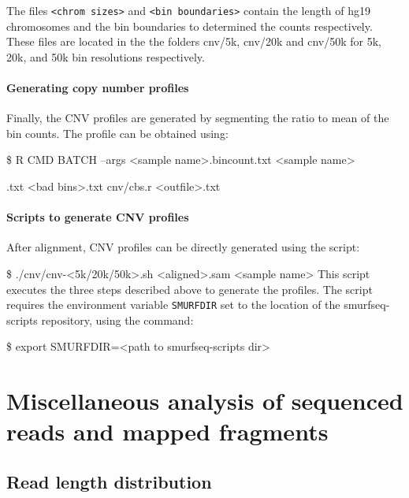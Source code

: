 \documentclass[11pt]{article}
\newenvironment{cmd}
{\list{}{
    \parsep=0em
    \itemindent=17pt
    \listparindent=50pt
    \leftmargin=0in
    \rightmargin=0in
  }\item[] \ttfamily \$}
{\endlist}
\begin{document}
The files \texttt{<chrom sizes>} and \texttt{<bin boundaries>} contain the
length of hg19 chromosomes and the bin boundaries to determined the counts
respectively. These files are located in the the folders cnv/5k, cnv/20k
and cnv/50k for 5k, 20k, and 50k bin resolutions respectively.

\paragraph{Generating copy number profiles}
Finally, the CNV profiles are generated by segmenting the ratio to mean of
the bin counts. The profile can be obtained using:
\begin{cmd}
  R CMD BATCH --args <sample name>.bincount.txt <sample name>
    \par <GC content>.txt <bad bins>.txt cnv/cbs.r <outfile>.txt
\end{cmd}

\paragraph{Scripts to generate CNV profiles}
After alignment, CNV profiles can be directly generated using the script:
\begin{cmd}
  ./cnv/cnv-<5k/20k/50k>.sh <aligned>.sam <sample name>
\end{cmd}
This script executes the three steps described above to generate the profiles.
The script requires the environment variable \texttt{SMURFDIR} set to the
location of the smurfseq-scripts repository, using the command:
\begin{cmd}
  export SMURFDIR=<path to smurfseq-scripts dir>
\end{cmd}



\section{Miscellaneous analysis of sequenced reads and mapped fragments}
\label{misc}

\subsection{Read length distribution}
\end{document}
